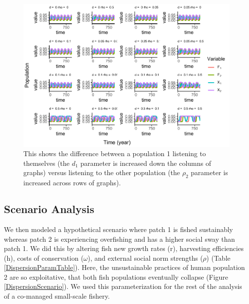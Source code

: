 \documentclass[
  12pt,
]{article}
\begin{document}
\begin{figure}
\centering
\includegraphics{Wulfing_CH2_Draft4_files/figure-latex/influenceAsym-1.pdf}
\caption{\label{fig:influenceAsym}This shows the difference between a population 1 listening to themselves (the \(d_1\) parameter is increased down the columns of graphs) versus listening to the other population (the \(\rho_2\) parameter is increased across rows of graphs). \label{influenceAsym}}
\end{figure}

\hypertarget{scenario-analysis}{%
\subsection{Scenario Analysis}\label{scenario-analysis}}

We then modeled a hypothetical scenario where patch 1 is fished sustainably whereas patch 2 is experiencing overfishing and has a higher social sway than patch 1. We did this by altering fish new growth rates (r), harvesting efficiencies (h), costs of conservation (\(\omega\)), and external social norm strengths (\(\rho\)) (Table \ref{DispersionParamTable}). Here, the unsustainable practices of human population 2 are so exploitative, that both fish populations eventually collapse (Figure \ref{DispersionScenario}). We used this parameterization for the rest of the analysis of a co-managed small-scale fishery.
\end{document}
